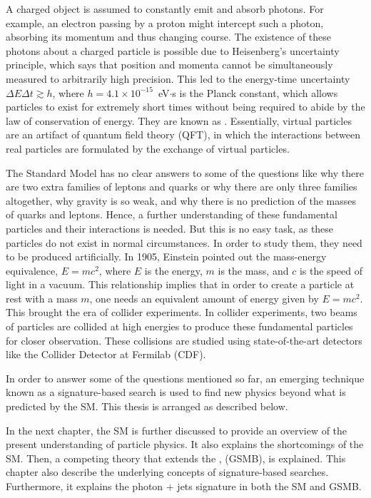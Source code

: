 A charged object is assumed to constantly emit and absorb photons. For example, an electron passing by a proton might intercept such a photon, absorbing its momentum and thus changing course. The existence of these photons about a charged particle is possible due to Heisenberg's uncertainty principle, which says that position and momenta cannot be simultaneously measured to arbitrarily high precision. This led to the energy-time uncertainty $\Delta E \Delta t\gtrsim h$, where $h=4.1\times10^{-15}$~eV$\cdot$s is the Planck constant, which allows particles to exist for extremely short times without being required to abide by the law of conservation of energy. They are known as . Essentially, virtual particles are an artifact of quantum field theory (QFT), in which the interactions between real particles are formulated by the exchange of virtual particles.

The Standard Model has no clear answers to some of the questions like why there are two extra families of leptons and quarks or why there are only three families altogether, why gravity is so weak, and why there is no prediction of the masses of quarks and leptons. Hence, a further understanding of these fundamental particles and their interactions is needed. But this is no easy task, as these particles do not exist in normal circumstances. In order to study them, they need to be produced artificially. In 1905, Einstein pointed out the mass-energy equivalence, $E=mc^{2}$, where $E$ is the energy, $m$ is the mass, and $c$ is the speed of light in a vacuum. This relationship implies that in order to create a particle at rest with a mass $m$, one needs an equivalent amount of energy given by $E=mc^{2}$. This brought the era of collider experiments. In collider experiments, two beams of particles are collided at high energies to produce these fundamental particles for closer observation. These collisions are studied using state-of-the-art detectors like the Collider Detector at Fermilab (CDF).

In order to answer some of the questions mentioned so far, an emerging technique known as a signature-based search is used to find new physics beyond what is predicted by the SM. This thesis is arranged as described below.

In the next chapter, the SM is further discussed to provide an overview of the present understanding of particle physics. It also explains the shortcomings of the SM. Then, a competing theory that extends the \SMtext, \GMSBtext (GSMB), is explained. This chapter also describe the underlying concepts of signature-based searches. Furthermore, it explains the photon + jets signature in both the SM and GSMB.

